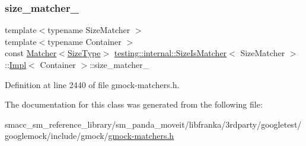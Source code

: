 \subsubsection{\texorpdfstring{size\+\_\+matcher\+\_\+}{size\_matcher\_}}
{\footnotesize\ttfamily template$<$typename Size\+Matcher $>$ \\
template$<$typename Container $>$ \\
const \hyperlink{classtesting_1_1Matcher}{Matcher}$<$\hyperlink{classtesting_1_1internal_1_1SizeIsMatcher_1_1Impl_a5548da0c4c2245ca2fb520f44f0a687a}{Size\+Type}$>$ \hyperlink{classtesting_1_1internal_1_1SizeIsMatcher}{testing\+::internal\+::\+Size\+Is\+Matcher}$<$ Size\+Matcher $>$\+::\hyperlink{classtesting_1_1internal_1_1SizeIsMatcher_1_1Impl}{Impl}$<$ Container $>$\+::size\+\_\+matcher\+\_\+\hspace{0.3cm}{\ttfamily [private]}}



Definition at line 2440 of file gmock-\/matchers.\+h.



The documentation for this class was generated from the following file\+:\begin{DoxyCompactItemize}
\item 
smacc\+\_\+sm\+\_\+reference\+\_\+library/sm\+\_\+panda\+\_\+moveit/libfranka/3rdparty/googletest/googlemock/include/gmock/\hyperlink{gmock-matchers_8h}{gmock-\/matchers.\+h}\end{DoxyCompactItemize}
